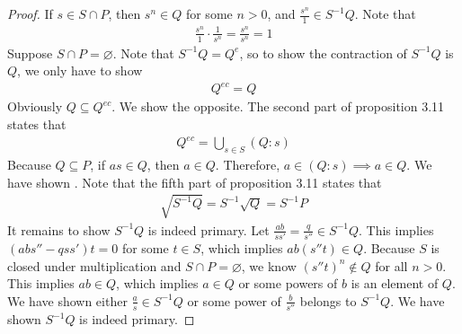 \documentclass{report}
\begin{document}
\begin{proof}
If $s \in S \cap P$, then $s^n \in Q$ for some $n>0$, and $\frac{s^n}{1} \in S^{-1}Q$. Note that 
\begin{align*}
\frac{s^n}{1}\cdot \frac{1}{s^n}= \frac{s^n}{s^n}=1
\end{align*}
Suppose $S \cap P=\varnothing$. Note that $S^{-1}Q=Q^e$, so to show the contraction of $S^{-1}Q$ is $Q$, we only have to show 
\begin{align}
\label{g1}
Q^{ec}=Q
\end{align}
Obviously $Q \subseteq Q^{ec}$. We show the opposite. The second part of proposition 3.11 states that 
\begin{align*}
Q^{ec}= \bigcup_{s \in S} (Q:s)
\end{align*}
Because $Q \subseteq P$, if $as \in Q$, then $a \in Q$. Therefore, $a \in (Q:s)\implies  a \in Q$. We have shown  . Note that the fifth part of proposition 3.11  states that 
\begin{align*}
\sqrt{S^{-1}Q}=S^{-1}\sqrt{Q}=S^{-1}P   
\end{align*}
It remains to show $S^{-1}Q$ is indeed primary. Let  $\frac{ab}{ss'} = \frac{q}{s''}\in S^{-1}Q$. This implies $(abs'' -qss')t=0$ for some $t \in S$, which implies $ab(s''t)\in Q$. Because $S$ is closed under multiplication and $S \cap P = \varnothing$, we know $(s''t)^n \not\in Q$ for all $n>0$. This implies  $ab \in Q$, which implies $a \in Q$ or some powers of  $b$ is an element of  $Q$. We have shown either  $\frac{a}{s} \in S^{-1}Q$ or some power of  $\frac{b}{s''}$ belongs to $S^{-1}Q$. We have shown $S^{-1}Q$ is indeed primary.
\end{proof}
\end{document}
